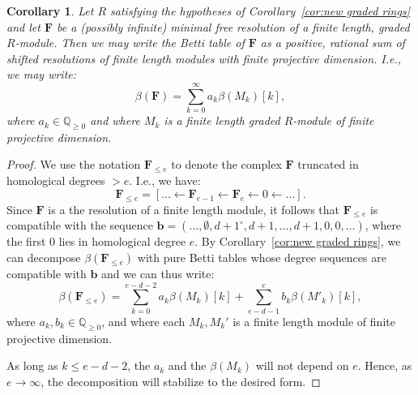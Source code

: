 \documentclass[12pt]{amsart}
\newtheorem{cor}[lemma]{Corollary}
\theoremstyle{definition}
\newtheorem{example}[lemma]{Example}
\theoremstyle{remark}
\newcommand{\kk}{\Bbbk}
\newcommand{\QQ}{\mathbb{Q}}
\newcommand{\bb}{\mathbf{b}}
\newcommand{\FF}{\mathbf{F}}
\newcommand{\zp}{\circ}
\begin{document}
\begin{cor}\label{cor:decomp infinite}
Let $R$ satisfying the hypotheses of Corollary~\ref{cor:new graded rings} and let $\FF$ be a (possibly infinite) minimal free resolution of a finite length, graded $R$-module.  Then we may write the Betti table of $\FF$ as a positive, rational sum of shifted resolutions of finite length modules with finite projective dimension.  I.e., we may write:
\[
\beta(\FF)=\sum_{k=0}^\infty a_k\beta(M_k)[k],
\]
where $a_k\in \QQ_{\geq 0}$ and where $M_k$ is a finite length graded $R$-module of finite projective dimension.
\end{cor}
\begin{proof}
We use the notation $\FF_{\leq e}$ to denote the complex $\FF$ truncated in homological degrees $>e$.  I.e., we have:
\[
\FF_{\leq e}=[\dots \gets \FF_{e-1}\gets \FF_e \gets 0 \gets \dots].
\]
Since $\FF$ is a the resolution of a finite length module, it follows that $\FF_{\leq e}$ is compatible with the sequence $\bb=(\dots, \emptyset, d+1^\zp, d+1, \dots, d+1,0,0,\dots)$, where the first $0$ lies in homological degree $e$.  By  Corollary~\ref{cor:new graded rings}, we can decompose $\beta(\FF_{\leq e})$ with pure Betti tables whose degree sequences are compatible with $\bb$ and we can thus write:
\[
\beta(\FF_{\leq e})=\sum_{k=0}^{e-d-2} a_k\beta(M_k)[k]+\sum_{e-d-1}^e b_k\beta(M'_k)[k],
\]
where $a_k,b_k\in \QQ_{\geq 0}$, and where each $M_k, M_k'$ is a finite length module of finite projective dimension.

As long as $k\leq e-d-2$, the $a_k$ and the $\beta(M_k)$ will not depend on $e$.  Hence, as $e\to \infty$, the decomposition will stabilize to the desired form.
\end{proof}
%
\end{document}
